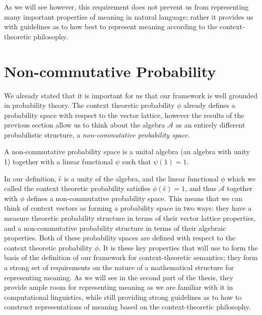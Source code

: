 As we will see however, this requirement does not prevent us from representing many important properties of meaning in natural language; rather it provides us with guidelines as to how best to represent meaning according to the context-theoretic philosophy.

\section{Non-commutative Probability}

We already stated that it is important for us that our framework is well grounded in probability theory. The context theoretic probability $\phi$ already defines a probability space with respect to the vector lattice, however the results of the previous section allow us to think about the algebra $\mathcal{A}$ as an entirely different probabilistic structure, a \emph{non-commutative probability space}.
\begin{defn}
A non-commutative probability space is a unital algebra (an algebra with unity 1) together with a linear functional $\psi$ such that $\psi(1) = 1$.
\end{defn}
In our definition, $\hat{\epsilon}$ is a unity of the algebra, and the linear functional $\phi$ which we called the context theoretic probability satisfies $\phi(\hat{\epsilon}) = 1$, and thus $\mathcal{A}$ together with $\phi$ defines a non-commutative probability space. This means that we can think of context vectors as forming a probability space in two ways: they have a measure theoretic probability structure in terms of their vector lattice properties, and a non-commutative probability structure in terms of their algebraic properties. Both of these probability spaces are defined with respect to the context theoretic probability $\phi$. It is these key properties that will use to form the basis of the definition of our framework for context-theoretic semantics; they form a strong set of requirements on the nature of a mathematical structure for representing meaning. As we will see in the second part of the thesis, they provide ample room for representing meaning as we are familiar with it in computational linguistics, while still providing strong guidelines as to how to construct representations of meaning based on the context-theoretic philosophy.


